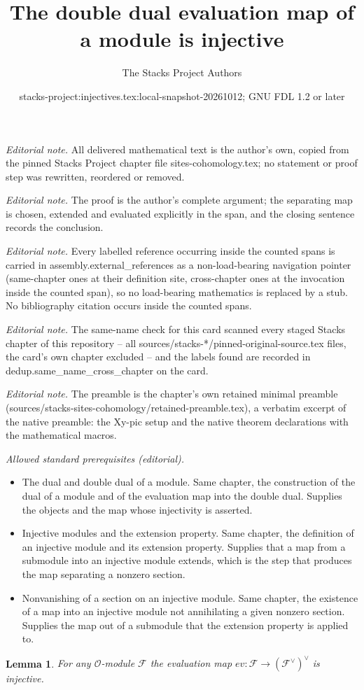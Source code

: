 \documentclass[10pt,a4paper]{amsart}
\title{The double dual evaluation map of a module is injective}
\author{The Stacks Project Authors}
\date{stacks-project:injectives.tex:local-snapshot-20261012; GNU FDL 1.2 or later}
\theoremstyle{plain}
\newtheorem{lemma}[subsection]{Lemma}
\theoremstyle{definition}
\theoremstyle{remark}
\numberwithin{equation}{subsection}
\begin{document}
\maketitle
\noindent\textit{Editorial note.} All delivered mathematical text is the author's own, copied from the pinned Stacks Project chapter file sites-cohomology.tex; no statement or proof step was rewritten, reordered or removed.\par\medskip
\noindent\textit{Editorial note.} The proof is the author's complete argument; the separating map is chosen, extended and evaluated explicitly in the span, and the closing sentence records the conclusion.\par\medskip
\noindent\textit{Editorial note.} Every labelled reference occurring inside the counted spans is carried in assembly.external\_references as a non-load-bearing navigation pointer (same-chapter ones at their definition site, cross-chapter ones at the invocation inside the counted span), so no load-bearing mathematics is replaced by a stub. No bibliography citation occurs inside the counted spans.\par\medskip
\noindent\textit{Editorial note.} The same-name check for this card scanned every staged Stacks chapter of this repository -- all sources/stacks-*/pinned-original-source.tex files, the card's own chapter excluded -- and the labels found are recorded in dedup.same\_name\_cross\_chapter on the card.\par\medskip
\noindent\textit{Editorial note.} The preamble is the chapter's own retained minimal preamble (sources/stacks-sites-cohomology/retained-preamble.tex), a verbatim excerpt of the native preamble: the Xy-pic setup and the native theorem declarations with the mathematical macros.\par\medskip
\noindent\textit{Allowed standard prerequisites (editorial).}\begin{itemize}
\item The dual and double dual of a module. Same chapter, the construction of the dual of a module and of the evaluation map into the double dual. Supplies the objects and the map whose injectivity is asserted.
\item Injective modules and the extension property. Same chapter, the definition of an injective module and its extension property. Supplies that a map from a submodule into an injective module extends, which is the step that produces the map separating a nonzero section.
\item Nonvanishing of a section on an injective module. Same chapter, the existence of a map into an injective module not annihilating a given nonzero section. Supplies the map out of a submodule that the extension property is applied to.
\end{itemize}\medskip
\begin{lemma}
\label{lemma-ev-injective-sheaves}
For any $\mathcal{O}$-module $\mathcal{F}$ the evaluation map
$ev : \mathcal{F} \to (\mathcal{F}^\vee)^\vee$ is injective.
\end{lemma}
\end{document}
